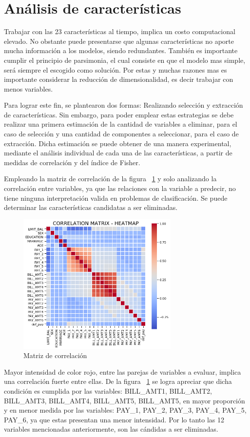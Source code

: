 \documentclass[conference]{IEEEtran}
\begin{document}
\section{Análisis de características}
Trabajar con las 23 características al tiempo, implica un costo computacional elevado. No obstante puede presentarse que algunas características no aporte mucha información a los modelos, siendo redundantes.  También es importante cumplir el principio de parsimonia, el cual consiste en que el modelo mas simple, será siempre el escogido como solución. Por estas y muchas razones mas es importante considerar la reducción de dimensionalidad, es decir trabajar con menos variables.

Para lograr este fin, se plantearon dos formas: Realizando selección y extracción de características. Sin embargo, para poder emplear estas estrategias se debe realizar una primera estimación de la cantidad de variables a eliminar, para el caso de selección  y una cantidad de componentes a seleccionar, para el caso de extracción. Dicha estimación se puede obtener de una manera experimental, mediante el análisis individual de cada una de las características, a partir de medidas de correlación y del índice de Fisher.

Empleando la matriz de correlación de la figura ~\ref{fig:matrizCorrelation} y solo analizando la correlación entre variables, ya que las relaciones con la variable a predecir, no tiene ninguna interpretación valida en problemas de clasificación. Se puede determinar las características candidatas a ser eliminadas.
\begin{center}
    \begin{figure}[H]
        \hfill
     \centerline{\includegraphics[width=8cm]{correlacion.png}}
    \caption{Matriz de correlación }
    \label{fig:matrizCorrelation}
    \end{figure}  
\end{center}
Mayor intensidad de color rojo, entre las parejas de variables a evaluar, implica una correlación fuerte entre ellas. De la figura ~\ref{fig:matrizCorrelation} se logra apreciar que dicha condición es cumplida por las variables: BILL\_AMT1, BILL\_AMT2, BILL\_AMT3, BILL\_AMT4, BILL\_AMT5, BILL\_AMT5, en mayor proporción y en menor medida por las variables: PAY\_1, PAY\_2, PAY\_3, PAY\_4, PAY\_5, PAY\_6, ya que estas presentan una menor intensidad. Por lo tanto las 12 variables mencionadas anteriormente, son las cándidas a ser eliminadas.
\end{document}
